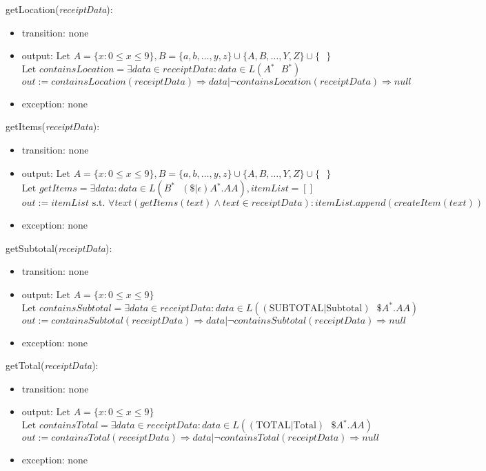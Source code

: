 \documentclass[12pt, titlepage]{article}
\begin{document}
\noindent getLocation(\textit{receiptData}):
\begin{itemize}
  \item transition: none
  \item output: $\text{Let } A=\{x : 0 \leq x \leq 9\}, B=\{a,b,\dots,y,z\}\cup\{A,B,\dots,Y,Z\}\cup\{\text{ }\}$ \\
                $\text{Let } containsLocation=\exists data \in receiptData : data \in L(A{}^\ast \text{ } B{}^\ast)$ \\
                $out := containsLocation(receiptData) \Rightarrow data | \neg containsLocation(receiptData) \Rightarrow null$
  \item exception: none
\end{itemize}

\noindent getItems(\textit{receiptData}):
\begin{itemize}
  \item transition: none
  \item output: $\text{Let } A=\{x : 0 \leq x \leq 9\}, B=\{a,b,\dots,y,z\}\cup\{A,B,\dots,Y,Z\}\cup\{\text{ }\}$ \\
                $\text{Let } getItems=\exists data : data \in L(B^\ast \text{ } (\$|\epsilon)A{}^\ast.AA), itemList=[]$ \\
                $out := itemList \text{ s.t. } \forall text(getItems(text) \land text \in receiptData) : itemList.append(createItem(text))$
  \item exception: none
\end{itemize}

\noindent getSubtotal(\textit{receiptData}):
\begin{itemize}
  \item transition: none
  \item output: $\text{Let } A=\{x : 0 \leq x \leq 9\}$ \\
                $\text{Let } containsSubtotal=\exists data \in receiptData : data \in L((\text{SUBTOTAL}|\text{Subtotal})\text{ }\$A{}^\ast.AA)$ \\
                $out := containsSubtotal(receiptData) \Rightarrow data | \neg containsSubtotal(receiptData) \Rightarrow null$
  \item exception: none
\end{itemize}

\noindent getTotal(\textit{receiptData}):
\begin{itemize}
  \item transition: none
  \item output: $\text{Let } A=\{x : 0 \leq x \leq 9\}$ \\
                $\text{Let } containsTotal=\exists data \in receiptData : data \in L((\text{TOTAL}|\text{Total})\text{ }\$A{}^\ast.AA)$ \\
                $out := containsTotal(receiptData) \Rightarrow data | \neg containsTotal(receiptData) \Rightarrow null$
  \item exception: none
\end{itemize}
\end{document}
